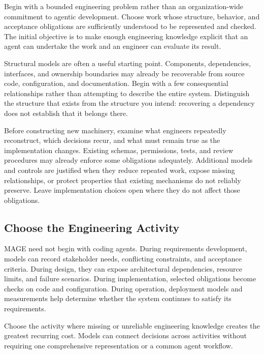 
Begin with a bounded engineering problem rather than an organization-wide commitment to agentic development. Choose work whose structure, behavior, and acceptance obligations are sufficiently understood to be represented and checked. The initial objective is to make enough engineering knowledge explicit that an agent can undertake the work and an engineer can evaluate its result.

Structural models are often a useful starting point. Components, dependencies, interfaces, and ownership boundaries may already be recoverable from source code, configuration, and documentation. Begin with a few consequential relationships rather than attempting to describe the entire system. Distinguish the structure that exists from the structure you intend: recovering a dependency does not establish that it belongs there.

Before constructing new machinery, examine what engineers repeatedly reconstruct, which decisions recur, and what must remain true as the implementation changes. Existing schemas, permissions, tests, and review procedures may already enforce some obligations adequately. Additional models and controls are justified when they reduce repeated work, expose missing relationships, or protect properties that existing mechanisms do not reliably preserve. Leave implementation choices open where they do not affect those obligations.

\subsection{Choose the Engineering Activity}\label{heading:choose-the-engineering-activity}

MAGE need not begin with coding agents. During requirements development, models can record stakeholder needs, conflicting constraints, and acceptance criteria. During design, they can expose architectural dependencies, resource limits, and failure scenarios. During implementation, selected obligations become checks on code and configuration. During operation, deployment models and measurements help determine whether the system continues to satisfy its requirements.

Choose the activity where missing or unreliable engineering knowledge creates the greatest recurring cost. Models can connect decisions across activities without requiring one comprehensive representation or a common agent workflow.

